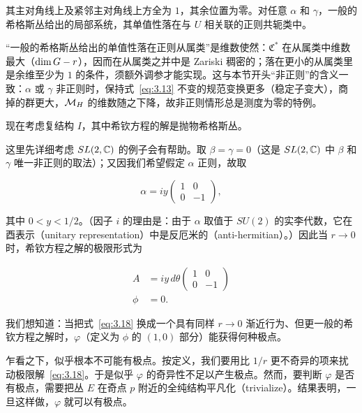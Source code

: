 其主对角线上及紧邻主对角线上方全为 $1$，其余位置为零。对任意 $\alpha$ 和 $\gamma$，一般的希格斯丛给出的局部系统，其单值性落在与 $U$ 相关联的正则共轭类中。

\begin{yizhu}[含糊点拨]
“一般的希格斯丛给出的单值性落在正则从属类”是维数使然：$\mathfrak C^*$ 在从属类中维数最大（${\rm dim}\,G-r$），因而在从属类之并中是 Zariski 稠密的；落在更小的从属类里是余维至少为 $1$ 的条件，须额外调参才能实现。这与本节开头“非正则”的含义一致：$\alpha$ 或 $\gamma$ 非正则时，保持式~\eqref{eq:3.13} 不变的规范变换更多（稳定子变大），商掉的群更大，${{\mathcal{M}}_H}$ 的维数随之下降，故非正则情形总是测度为零的特例。
\end{yizhu}

\bigskip{}

现在考虑复结构 $I$，其中希钦方程的解是抛物希格斯丛。

这里先详细考虑 $SL(2,{\mathbb{C}})$ 的例子会有帮助。取 $\beta=\gamma=0$（这是 $SL(2,{\mathbb{C}})$ 中 $\beta$ 和 $\gamma$ 唯一非正则的取法）；又因我们希望假定 $\alpha$ 正则，故取

\setcounter{equation}{16}
\begin{equation}\label{eq:3.17}
  \alpha=iy\left(\begin{matrix}1 & 0\\ 0&-1\end{matrix}\right),
\end{equation}

其中 $0<y<1/2$。（因子 $i$ 的理由是：由于 $\alpha$ 取值于 $SU(2)$ 的实李代数，它在酉表示（unitary representation）中是反厄米的（anti-hermitian）。）因此当 $r\to 0$ 时，希钦方程之解的极限形式为

\setcounter{equation}{17}
\begin{equation}\label{eq:3.18}
  \begin{aligned}A&=iy\,d\theta\left(\begin{matrix}1 & 0\\ 0&-1\end{matrix}\right)\\
                   \phi&=0.\end{aligned}
\end{equation}

我们想知道：当把式~\eqref{eq:3.18} 换成一个具有同样 $r\to 0$ 渐近行为、但更一般的希钦方程之解时，$\varphi$（定义为 $\phi$ 的 $(1,0)$ 部分）能获得何种极点。

乍看之下，似乎根本不可能有极点。按定义，我们要用比 $1/r$ 更不奇异的项来扰动极限解~\eqref{eq:3.18}。于是似乎 $\varphi$ 的奇异性不足以产生极点。然而，要判断 $\varphi$ 是否有极点，需要把丛 $E$ 在奇点 $p$ 附近的全纯结构平凡化（trivialize）。结果表明，一旦这样做，$\varphi$ 就可以有极点。

